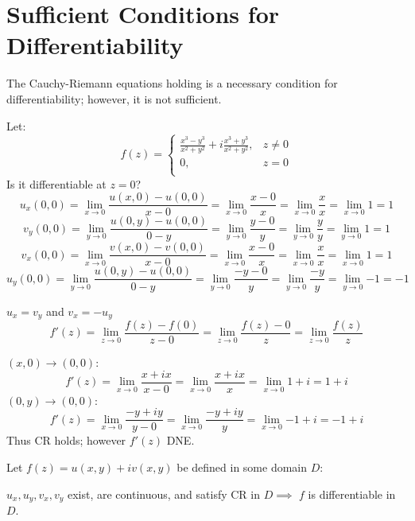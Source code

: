 \documentclass[letterpaper,12pt,fleqn]{article}
\newcommand{\limx}{\lim_{x\to 0}}
\newcommand{\limy}{\lim_{y\to 0}}
\newcommand{\limz}{\lim_{z\to 0}}
\begin{document}
\section*{Sufficient Conditions for Differentiability}

The Cauchy-Riemann equations holding is a necessary condition for
differentiability; however, it is not sufficient.

\begin{example}
  Let:
  \[f(z)=\begin{cases}
  \frac{x^3-y^3}{x^2+y^2}+i\frac{x^3+y^3}{x^2+y^2}, & z\ne0 \\
  0, & z=0 \\
  \end{cases}\]
  Is it differentiable at $z=0$?
  \[u_x(0,0)=\limx{\frac{u(x,0)-u(0,0)}{x-0}}=\limx{\frac{x-0}{x}}=
  \limx{\frac{x}{x}}=\limx{1}=1\]
  \[v_y(0,0)=\limy{\frac{u(0,y)-u(0,0)}{0-y}}=\limy{\frac{y-0}{y}}=
  \limy{\frac{y}{y}}=\limy{1}=1\]
  \[v_x(0,0)=\limx{\frac{v(x,0)-v(0,0)}{x-0}}=\limx{\frac{x-0}{x}}=
  \limx{\frac{x}{x}}=\limx{1}=1\]
  \[u_y(0,0)=\limy{\frac{u(0,y)-u(0,0)}{0-y}}=\limy{\frac{-y-0}{y}}=
  \limy{\frac{-y}{y}}=\limy{-1}=-1\]

  $u_x=v_y$ and $v_x=-u_y$
  \[f'(z)=\limz{\frac{f(z)-f(0)}{z-0}}=\limz{\frac{f(z)-0}{z}}=
  \limz{\frac{f(z)}{z}}\]

  $(x,0)\to(0,0)$:
  \[f'(z)=\limx{\frac{x+ix}{x-0}}=\limx{\frac{x+ix}{x}}=\limx{1+i}=1+i\]
  $(0,y)\to(0,0)$:
  \[f'(z)=\limx{\frac{-y+iy}{y-0}}=\limx{\frac{-y+iy}{y}}=\limx{-1+i}=-1+i\]
  Thus CR holds; however $f'(z)$ DNE.
\end{example}

\begin{theorem}
  Let $f(z)=u(x,y)+iv(x,y)$ be defined in some domain $D$:

  $u_x,u_y,v_x,v_y$ exist, are continuous, and satisfy CR in $D\implies$ $f$ is
  differentiable in $D$.
\end{theorem}
\end{document}

